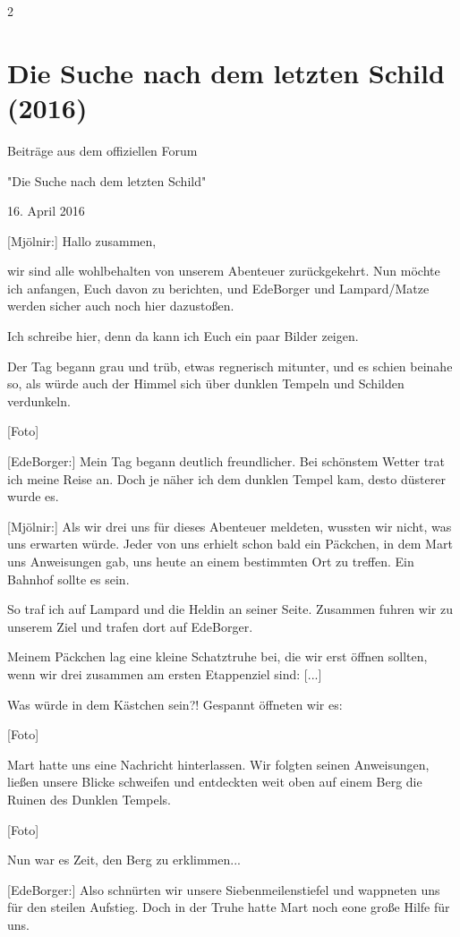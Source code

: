 \documentclass[10pt, a4paper, oneside]{book}
\newcommand{\storytext}[2][]{%
        \section{#2}%
        \label{storytext-#1}%
    }
\newcommand{\fillbreak}{\vspace*{\fill}\columnbreak}
\begin{document}
\begin{multicols}{2}
\fillbreak
\storytext[2016-die-suche-nach-dem-letzten-schild]{Die Suche nach dem letzten Schild (2016)}

\begin{center}
    Beiträge aus dem offiziellen Forum

    "Die Suche nach dem letzten Schild"

    16. April 2016
\end{center}



[Mjölnir:] Hallo zusammen,

wir sind alle wohlbehalten von unserem Abenteuer zurückgekehrt. Nun möchte ich anfangen, Euch davon zu berichten, und EdeBorger und Lampard/Matze werden sicher auch noch hier dazustoßen.

Ich schreibe hier, denn da kann ich Euch ein paar Bilder zeigen.

Der Tag begann grau und trüb, etwas regnerisch mitunter, und es schien beinahe so, als würde auch der Himmel sich über dunklen Tempeln und Schilden verdunkeln.

[Foto]

[EdeBorger:] Mein Tag begann deutlich freundlicher. Bei schönstem Wetter trat ich meine Reise an. Doch je näher ich dem dunklen Tempel kam, desto düsterer wurde es.

[Mjölnir:] Als wir drei uns für dieses Abenteuer meldeten, wussten wir nicht, was uns erwarten würde. Jeder von uns erhielt schon bald ein Päckchen, in dem Mart uns Anweisungen gab, uns heute an einem bestimmten Ort zu treffen. Ein Bahnhof sollte es sein.

So traf ich auf Lampard und die Heldin an seiner Seite. Zusammen fuhren wir zu unserem Ziel und trafen dort auf EdeBorger.

Meinem Päckchen lag eine kleine Schatztruhe bei, die wir erst öffnen sollten, wenn wir drei zusammen am ersten Etappenziel sind: [...]

Was würde in dem Kästchen sein?! Gespannt öffneten wir es:

[Foto]

Mart hatte uns eine Nachricht hinterlassen. Wir folgten seinen Anweisungen, ließen unsere Blicke schweifen und entdeckten weit oben auf einem Berg die Ruinen des Dunklen Tempels.

[Foto]

Nun war es Zeit, den Berg zu erklimmen...

[EdeBorger:] Also schnürten wir unsere Siebenmeilenstiefel und wappneten uns für den steilen Aufstieg. Doch in der Truhe hatte Mart noch eone große Hilfe für uns.


\end{multicols}
\end{document}
